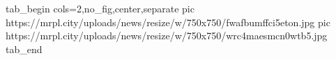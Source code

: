  
 
 
 
 


\ifcmt
  tab_begin cols=2,no_fig,center,separate
     pic https://mrpl.city/uploads/news/resize/w/750x750/fwafbumffci5eton.jpg
     pic https://mrpl.city/uploads/news/resize/w/750x750/wrc4maesmcn0wtb5.jpg
  tab_end
\fi
